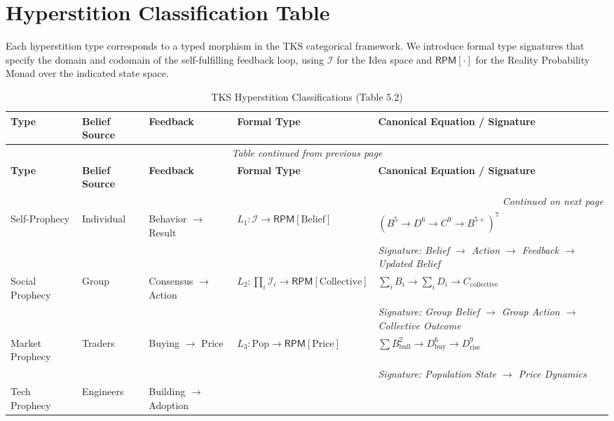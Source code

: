 \documentclass[11pt,twoside]{book}
\renewcommand{\arraystretch}{1.2}  %
\newcommand{\Ideas}{\mathcal{I}}
\newcommand{\RPM}{\mathsf{RPM}}
\begin{document}
\section{Hyperstition Classification Table}

Each hyperstition type corresponds to a typed morphism in the TKS categorical framework.
We introduce formal type signatures that specify the domain and codomain of the
self-fulfilling feedback loop, using $\Ideas$ for the Idea space and $\RPM[\cdot]$
for the Reality Probability Monad over the indicated state space.

\begin{center}
\small
\renewcommand{\arraystretch}{1.3}
\begin{longtable}{p{1.6cm}|p{1.6cm}|p{1.8cm}|p{3.2cm}|p{3.8cm}}
\caption{TKS Hyperstition Classifications (Table 5.2)} \label{tab:hyperstition-class} \\
\toprule
\textbf{Type} & \textbf{Belief Source} & \textbf{Feedback} & \textbf{Formal Type} & \textbf{Canonical Equation / Signature} \\
\midrule
\endfirsthead
\multicolumn{5}{c}{\textit{Table continued from previous page}} \\
\toprule
\textbf{Type} & \textbf{Belief Source} & \textbf{Feedback} & \textbf{Formal Type} & \textbf{Canonical Equation / Signature} \\
\midrule
\endhead
\midrule
\multicolumn{5}{r}{\textit{Continued on next page}} \\
\endfoot
\bottomrule
\endlastfoot
Self-Prophecy & Individual & Behavior $\to$ Result &
$L_1 : \Ideas \to \RPM[\mathrm{Belief}]$ &
$(B^5 \to D^6 \to C^9 \to B^{5+})^7$ \\
& & & & \textit{Signature: Belief $\to$ Action $\to$ Feedback $\to$ Updated Belief} \\
\midrule
Social Prophecy & Group & Consensus $\to$ Action &
$L_2 : \prod_i \Ideas_i \to \RPM[\mathrm{Collective}]$ &
$\sum_i B_i \to \sum_i D_i \to C_{\mathrm{collective}}$ \\
& & & & \textit{Signature: Group Belief $\to$ Group Action $\to$ Collective Outcome} \\
\midrule
Market Prophecy & Traders & Buying $\to$ Price &
$L_3 : \mathrm{Pop} \to \RPM[\mathrm{Price}]$ &
$\sum B^2_{\mathrm{bull}} \to D^6_{\mathrm{buy}} \to D^9_{\mathrm{rise}}$ \\
& & & & \textit{Signature: Population State $\to$ Price Dynamics} \\
\midrule
Tech Prophecy & Engineers & Building $\to$ Adoption &

\end{longtable}
\end{center}
\end{document}
